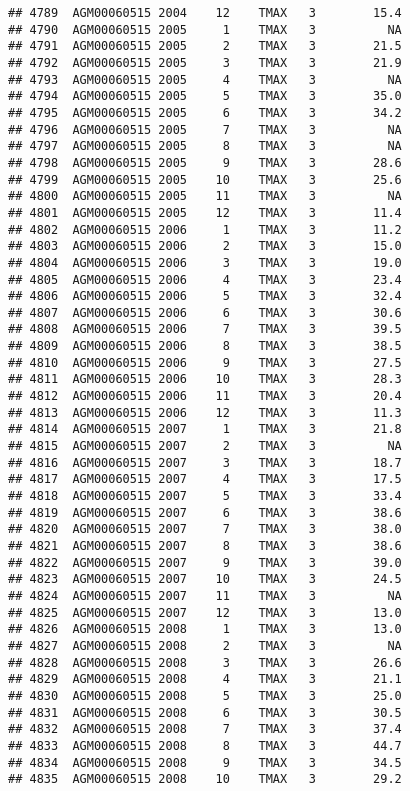 \documentclass{article}\usepackage[]{graphicx}\usepackage[]{color}
\makeatletter
\newenvironment{kframe}{%
 \def\at@end@of@kframe{}%
 \ifinner\ifhmode%
  \def\at@end@of@kframe{\end{minipage}}%
  \begin{minipage}{\columnwidth}%
 \fi\fi%
 \def\FrameCommand##1{\hskip\@totalleftmargin \hskip-\fboxsep
 \colorbox{shadecolor}{##1}\hskip-\fboxsep
     \hskip-\linewidth \hskip-\@totalleftmargin \hskip\columnwidth}%
 \MakeFramed {\advance\hsize-\width
   \@totalleftmargin\z@ \linewidth\hsize
   \@setminipage}}%
 {\par\unskip\endMakeFramed%
 \at@end@of@kframe}
\newenvironment{knitrout}{}{} %
\makeatother
\begin{document}
\begin{knitrout}
\begin{kframe}
\begin{verbatim}
## 4789  AGM00060515 2004    12    TMAX   3        15.4
## 4790  AGM00060515 2005     1    TMAX   3          NA
## 4791  AGM00060515 2005     2    TMAX   3        21.5
## 4792  AGM00060515 2005     3    TMAX   3        21.9
## 4793  AGM00060515 2005     4    TMAX   3          NA
## 4794  AGM00060515 2005     5    TMAX   3        35.0
## 4795  AGM00060515 2005     6    TMAX   3        34.2
## 4796  AGM00060515 2005     7    TMAX   3          NA
## 4797  AGM00060515 2005     8    TMAX   3          NA
## 4798  AGM00060515 2005     9    TMAX   3        28.6
## 4799  AGM00060515 2005    10    TMAX   3        25.6
## 4800  AGM00060515 2005    11    TMAX   3          NA
## 4801  AGM00060515 2005    12    TMAX   3        11.4
## 4802  AGM00060515 2006     1    TMAX   3        11.2
## 4803  AGM00060515 2006     2    TMAX   3        15.0
## 4804  AGM00060515 2006     3    TMAX   3        19.0
## 4805  AGM00060515 2006     4    TMAX   3        23.4
## 4806  AGM00060515 2006     5    TMAX   3        32.4
## 4807  AGM00060515 2006     6    TMAX   3        30.6
## 4808  AGM00060515 2006     7    TMAX   3        39.5
## 4809  AGM00060515 2006     8    TMAX   3        38.5
## 4810  AGM00060515 2006     9    TMAX   3        27.5
## 4811  AGM00060515 2006    10    TMAX   3        28.3
## 4812  AGM00060515 2006    11    TMAX   3        20.4
## 4813  AGM00060515 2006    12    TMAX   3        11.3
## 4814  AGM00060515 2007     1    TMAX   3        21.8
## 4815  AGM00060515 2007     2    TMAX   3          NA
## 4816  AGM00060515 2007     3    TMAX   3        18.7
## 4817  AGM00060515 2007     4    TMAX   3        17.5
## 4818  AGM00060515 2007     5    TMAX   3        33.4
## 4819  AGM00060515 2007     6    TMAX   3        38.6
## 4820  AGM00060515 2007     7    TMAX   3        38.0
## 4821  AGM00060515 2007     8    TMAX   3        38.6
## 4822  AGM00060515 2007     9    TMAX   3        39.0
## 4823  AGM00060515 2007    10    TMAX   3        24.5
## 4824  AGM00060515 2007    11    TMAX   3          NA
## 4825  AGM00060515 2007    12    TMAX   3        13.0
## 4826  AGM00060515 2008     1    TMAX   3        13.0
## 4827  AGM00060515 2008     2    TMAX   3          NA
## 4828  AGM00060515 2008     3    TMAX   3        26.6
## 4829  AGM00060515 2008     4    TMAX   3        21.1
## 4830  AGM00060515 2008     5    TMAX   3        25.0
## 4831  AGM00060515 2008     6    TMAX   3        30.5
## 4832  AGM00060515 2008     7    TMAX   3        37.4
## 4833  AGM00060515 2008     8    TMAX   3        44.7
## 4834  AGM00060515 2008     9    TMAX   3        34.5
## 4835  AGM00060515 2008    10    TMAX   3        29.2

\end{verbatim}
\end{kframe}
\end{knitrout}
\end{document}
